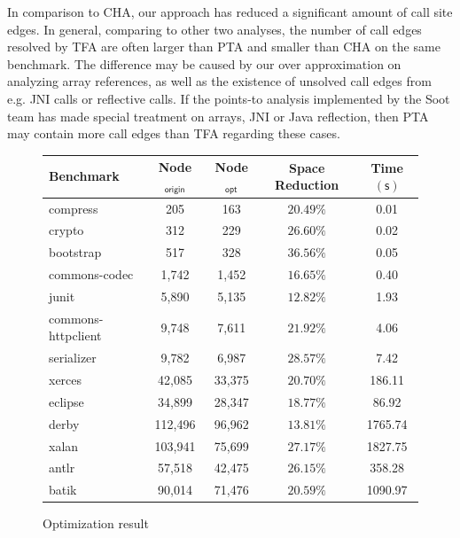 \documentclass[runningheads]{llncs}
\begin{document}
In comparison to CHA, our approach has reduced a significant amount of call site edges.
In general, comparing to other two analyses, the number of call edges resolved by TFA are often larger than PTA and smaller than CHA on the same benchmark. The difference may be caused by our over approximation on analyzing array references, as well as the existence of unsolved call edges from e.g. JNI calls or reflective calls. If the points-to analysis implemented by the Soot team has made special treatment on arrays, JNI or Java reflection, then PTA may contain more call edges than TFA regarding these cases.


\begin{figure}[t!]
  \centering
\begin{tabular}{lcccc}
	\hline
	\textbf{Benchmark} &\hspace{5pt} \textbf{Node$_{\textsf{origin}}$} &\hspace{5pt} \textbf{Node$_{\textsf{opt}}$} &\hspace{5pt} \textbf{Space Reduction} & \hspace{5pt}\textbf{Time$(\textsf{s})$} \\
	\hline
	compress & 205 & 163 & $20.49\%$ & 0.01  \\
	crypto & 312 & 229 & $26.60\%$ & 0.02 \\
	bootstrap & 517 & 328 & $36.56\%$ & 0.05 \\
	commons-codec & 1,742 & 1,452 & $16.65\%$ & 0.40 \\
	junit & 5,890 & 5,135 & $12.82\%$ & 1.93 \\
	commons-httpclient & 9,748 & 7,611 & $21.92\%$ & 4.06 \\
	serializer & 9,782 & 6,987 & $28.57\%$ & 7.42 \\
	xerces & 42,085 & 33,375 & $20.70\%$ & 186.11 \\
	eclipse & 34,899 & 28,347 & $18.77\%$ & 86.92 \\
	derby & 112,496 & 96,962 & $13.81\%$ & 1765.74 \\
	xalan & 103,941 & 75,699 & $27.17\%$ & 1827.75 \\
	antlr & 57,518 & 42,475 & $26.15\%$ & 358.28 \\
	batik & 90,014 & 71,476 & $20.59\%$ & 1090.97 \\
	\hline
\end{tabular}
\caption{Optimization result}
\label{experiment:Optimalization}
\end{figure}
\end{document}
